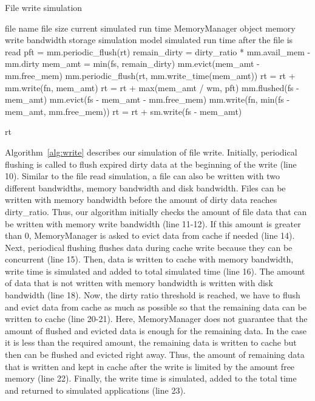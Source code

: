 \documentclass[conference]{IEEEtran}
\newcommand{\Desc}[2]{\State \makebox[2em][l]{#1}#2}
\begin{document}
			\begin{algorithm}\caption{File write simulation}\label{alg:write}
				\small
				\begin{algorithmic}[1]
					\Input
        				\Desc{fn}{file name}
        				\Desc{fs}{file size}
						\Desc{rt}{current simulated run time}
						\Desc{mm}{MemoryManager object}
						\Desc{wm}{memory write bandwidth}
						\Desc{sm}{storage simulation model}
   					\EndInput
   					\Output
						\Desc{rt}{simulated run time after the file is read}
   					\EndOutput
   					\State pft = mm.periodic\_flush(rt)
					\State remain\_dirty = dirty\_ratio * mm.avail\_mem - mm.dirty
					\State mem\_amt = min(fs, remain\_dirty)
					 
    					\State mm.evict(mem\_amt - mm.free\_mem)
    					\State mm.periodic\_flush(rt, mm.write\_time(mem\_amt)) 
    					\State rt = rt + mm.write(fn, mem\_amt)
    				\EndIf
    				\State rt = rt + max(mem\_amt / wm, pft) 
					  
						\State mm.flushed(fs - mem\_amt)  
						\State mm.evict(fs - mem\_amt  - mm.free\_mem) 
						\State mm.write(fn, min(fs - mem\_amt, mm.free\_mem))
						\State rt = rt + sm.write(fs - mem\_amt)
					\EndIf
					
					\Return rt
					
				\end{algorithmic}
			\end{algorithm}

			Algorithm~\ref{alg:write} describes our simulation of file write. 
			Initially, periodical flushing is called to flush expired dirty data 
			at the beginning of the write (line 10).
			Similar to the file read simulation, a file can also be written with 
			two different bandwidths, memory bandwidth and disk bandwidth. 
			Files can be written with memory bandwidth before the amount 
			of dirty data reaches dirty\_ratio. Thus, our algorithm initially checks 
			the amount of file data that can be written with memory write 
			bandwidth (line 11-12).
			If this amount is greater than 0, MemoryManager is asked to evict 
			data from cache if needed (line 14).
			Next, periodical flushing flushes data during cache write because they 
			can be concurrent (line 15). Then, data is written to cache with memory 
			bandwidth, write time is simulated and added to total simulated 
			time (line 16).
			The amount of data that is not written with memory bandwidth is written 
			with disk bandwidth (line 18). 
			Now, the dirty ratio threshold is reached, we have to flush and evict 
			data from cache as much as possible so that 
			the remaining data can be written to cache (line 20-21). 
			Here, MemoryManager does not guarantee that the amount of flushed 
			and evicted data is enough for the remaining data. In the case it is 
			less than the required amount, the remaining data is written to cache 
			but then can be flushed and evicted right away. Thus, the amount 
			of remaining data that is written and kept in cache after the write 
			is limited by the amount free memory (line 22). 
			Finally, the write time is simulated, added to the total time and 
			returned to simulated applications (line 23).
			
\end{document}
